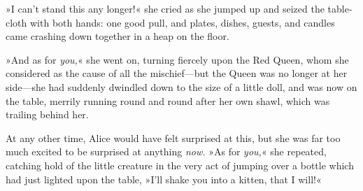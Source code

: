 »I can't stand this any longer!« she cried as she jumped up and seized the table-cloth with both hands: one good pull, and plates, dishes, guests, and candles came crashing down together in a heap on the floor.

»And as for \textit{you,}« she went on, turning fiercely upon the Red Queen, whom she considered as the cause of all the mischief—but the Queen was no longer at her side—she had suddenly dwindled down to the size of a little doll, and was now on the table, merrily running round and round after her own shawl, which was trailing behind her.

At any other time, Alice would have felt surprised at this, but she was far too much excited to be surprised at anything \textit{now.} »As for \textit{you,}« she repeated, catching hold of the little creature in the very act of jumping over a bottle which had just lighted upon the table, »I'll shake you into a kitten, that I will!«